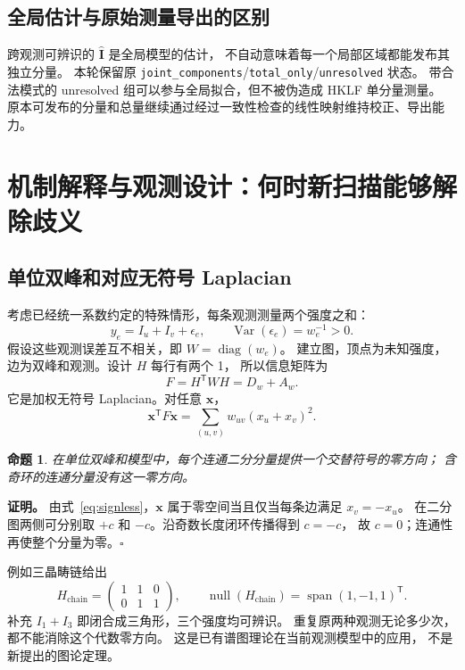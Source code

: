 \documentclass[UTF8,11pt,a4paper,fontset=fandol]{ctexart}
\newcommand{\diag}{\operatorname{diag}}
\newcommand{\Var}{\operatorname{Var}}
\newcommand{\Null}{\operatorname{null}}
\newcommand{\T}{^{\mathsf T}}
\newtheorem{proposition}{命题}[section]
\begin{document}
\subsection{全局估计与原始测量导出的区别}

跨观测可辨识的 $\widehat{\bm I}$ 是全局模型的估计，
不自动意味着每一个局部区域都能发布其独立分量。
本轮保留原 \texttt{joint\_components}/\texttt{total\_only}/\texttt{unresolved} 状态。
带合法模式的 unresolved 组可以参与全局拟合，但不被伪造成 HKLF 单分量测量。
原本可发布的分量和总量继续通过经过一致性检查的线性映射维持校正、导出能力。

\section{机制解释与观测设计：何时新扫描能够解除歧义}

\subsection{单位双峰和对应无符号 Laplacian}

考虑已经统一系数约定的特殊情形，每条观测测量两个强度之和：
\begin{equation}
y_e=I_u+I_v+\epsilon_e,\qquad \Var(\epsilon_e)=w_e^{-1}>0.
\end{equation}
假设这些观测误差互不相关，即 $W=\diag(w_e)$。
建立图，顶点为未知强度，边为双峰和观测。设计 $H$ 每行有两个 1，
所以信息矩阵为
\begin{equation}
F=H\T WH=D_w+A_w.
\end{equation}
它是加权无符号 Laplacian。对任意 $\bm x$，
\begin{equation}\label{eq:signless}
\bm x\T F\bm x=\sum_{(u,v)}w_{uv}(x_u+x_v)^2.
\end{equation}

\begin{proposition}
在单位双峰和模型中，每个连通二分分量提供一个交替符号的零方向；
含奇环的连通分量没有这一零方向。
\end{proposition}

\noindent\textbf{证明。}
由式~\eqref{eq:signless}，$\bm x$ 属于零空间当且仅当每条边满足 $x_v=-x_u$。
在二分图两侧可分别取 $+c$ 和 $-c$。沿奇数长度闭环传播得到 $c=-c$，
故 $c=0$；连通性再使整个分量为零。\hfill$\square$

例如三晶畴链给出
\begin{equation}
H_{\mathrm{chain}}=
\begin{pmatrix}1&1&0\\0&1&1\end{pmatrix},\qquad
\Null(H_{\mathrm{chain}})=\operatorname{span}(1,-1,1)\T .
\end{equation}
补充 $I_1+I_3$ 即闭合成三角形，三个强度均可辨识。
重复原两种观测无论多少次，都不能消除这个代数零方向。
这是已有谱图理论在当前观测模型中的应用\cite{cvetkovic2007,cvetkovicbounds}，
不是新提出的图论定理。
\end{document}
